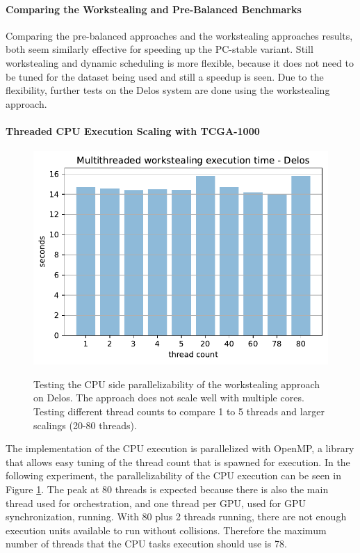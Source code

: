 \paragraph{Comparing the Workstealing and Pre-Balanced Benchmarks}
Comparing the pre-balanced approaches and the workstealing approaches results, both seem similarly effective for speeding up the PC-stable variant. Still workstealing and dynamic scheduling is more flexible, because it does not need to be tuned for the dataset being used and still a speedup is seen. Due to the flexibility, further tests on the Delos system are done using the workstealing approach.

\paragraph{Threaded CPU Execution Scaling with TCGA-1000}
\begin{figure}[H]
  \caption{Testing the CPU side parallelizability of the workstealing approach on Delos. The approach does not scale well with multiple cores. Testing different thread counts to compare 1 to 5 threads and larger scalings (20-80 threads).}
  \includegraphics[width=\textwidth]{figures/threaded_wsteal.pdf}
  \centering
  \label{fig:wstealing_threaded_delos}
\end{figure}

The implementation of the CPU execution is parallelized with OpenMP, a library that allows easy tuning of the thread count that is spawned for execution. In the following experiment, the parallelizability of the CPU execution can be seen in Figure \ref{fig:wstealing_threaded_delos}.
The peak at 80 threads is expected because there is also the main thread used for orchestration, and one thread per GPU, used for GPU synchronization, running. With 80 plus 2 threads running, there are not enough execution units available to run without collisions. Therefore the maximum number of threads that the CPU tasks execution should use is 78.

